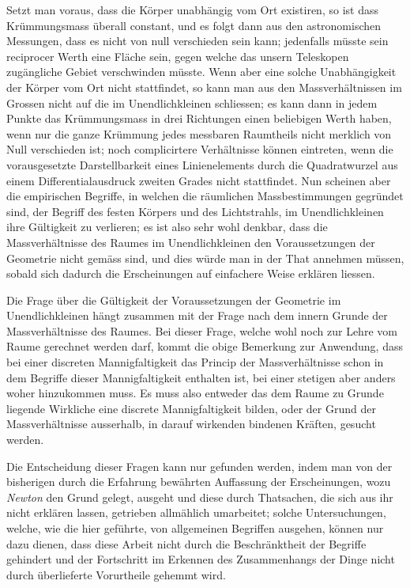 \documentclass[a4paper,12pt]{article}
\begin{document}
Setzt man voraus, dass die K\"{o}rper unabh\"{a}ngig vom Ort
existiren, so ist dass Kr\"{u}mmungsmass \"{u}berall constant,
und es folgt dann aus den astronomischen Messungen, dass es nicht
von null verschieden sein kann; jedenfalls m\"{u}sste sein
reciprocer Werth eine Fl\"{a}che sein, gegen welche das unsern
Teleskopen zug\"{a}ngliche Gebiet verschwinden m\"{u}sste.  Wenn
aber eine solche Unabh\"{a}ngigkeit der K\"{o}rper vom Ort nicht
stattfindet, so kann man aus den Massverh\"{a}ltnissen im Grossen
nicht auf die im Unendlichkleinen schliessen; es kann dann in
jedem Punkte das Kr\"{u}mmungsmass in drei Richtungen einen
beliebigen Werth haben, wenn nur die ganze Kr\"{u}mmung jedes
messbaren Raumtheils nicht merklich von Null verschieden ist; noch
complicirtere Verh\"{a}ltnisse k\"{o}nnen eintreten, wenn die
vorausgesetzte Darstellbarkeit eines Linienelements durch die
Quadratwurzel aus einem Differentialausdruck zweiten Grades nicht
stattfindet.  Nun scheinen aber die empirischen Begriffe, in
welchen die r\"{a}umlichen Massbestimmungen gegr\"{u}ndet sind,
der Begriff des festen K\"{o}rpers und des Lichtstrahls, im
Unendlichkleinen ihre G\"{u}ltigkeit zu verlieren; es ist also
sehr wohl denkbar, dass die Massverh\"{a}ltnisse des Raumes im
Unendlichkleinen den Voraussetzungen der Geometrie nicht
gem\"{a}ss sind, und dies w\"{u}rde man in der That annehmen
m\"{u}ssen, sobald sich dadurch die Erscheinungen auf einfachere
Weise erkl\"{a}ren liessen.

Die Frage \"{u}ber die G\"{u}ltigkeit der Voraussetzungen der
Geometrie im Unendlichkleinen h\"{a}ngt zusammen mit der Frage
nach dem innern Grunde der Massverh\"{a}ltnisse des Raumes.  Bei
dieser Frage, welche wohl noch zur Lehre vom Raume gerechnet
werden darf, kommt die obige Bemerkung zur Anwendung, dass bei
einer discreten Mannigfaltigkeit das Princip der
Massverh\"{a}ltnisse schon in dem Begriffe dieser
Mannigfaltigkeit enthalten ist, bei einer stetigen aber anders
woher hinzukommen muss.   Es muss also entweder das dem Raume zu
Grunde liegende Wirkliche eine discrete Mannigfaltigkeit bilden,
oder der Grund der Massverh\"{a}ltnisse ausserhalb, in darauf
wirkenden bindenen Kr\"{a}ften, gesucht werden.

Die Entscheidung dieser Fragen kann nur gefunden werden, indem
man von der bisherigen durch die Erfahrung bew\"{a}hrten
Auffassung der Erscheinungen, wozu \emph{Newton} den Grund
gelegt, ausgeht und diese durch Thatsachen, die sich aus ihr
nicht erkl\"{a}ren lassen, getrieben allm\"{a}hlich umarbeitet;
solche Untersuchungen, welche, wie die hier gef\"{u}hrte, von
allgemeinen Begriffen ausgehen, k\"{o}nnen nur dazu dienen, dass
diese Arbeit nicht durch die Beschr\"{a}nktheit der Begriffe
gehindert und der Fortschritt im Erkennen des Zusammenhangs der
Dinge nicht durch \"{u}berlieferte Vorurtheile gehemmt wird.
\end{document}

